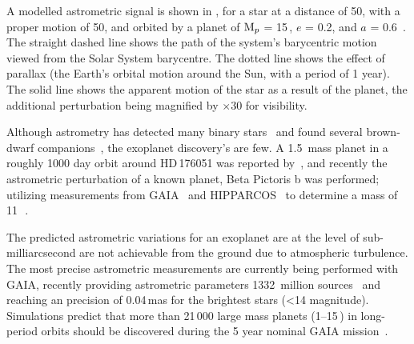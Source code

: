 A modelled astrometric signal is shown in , for a star at a distance of 50\pc, with a proper motion of 50\masperyr{}, and orbited by a planet of $\textrm{M}_{p}$ = 15\,\Mjup, $e$ = 0.2, and $a$ = 0.6\AU~\citep{perryman_extrasolar_2000}.
The straight dashed line shows the path of the system's barycentric motion viewed from the Solar System barycentre.
The dotted line shows the effect of parallax (the Earth's orbital motion around the Sun, with a period of 1 year).
The solid line shows the apparent motion of the star as a result of the planet, the additional perturbation being magnified by $\times 30$ for visibility.

Although astrometry has detected many binary stars~\citet[e.g.][]{gontcharov_new_2000} and found several brown-dwarf companions~\citep[e.g.][]{sahlmann_search_2011}, the exoplanet discovery's are few.
A 1.5\,\Mjup{} mass planet in a roughly 1000 day orbit around {HD\,176051} was reported by~\citet{muterspaugh_phases_2010}, and recently the astrometric perturbation of a known planet, {Beta Pictoris b} was performed; utilizing measurements from {GAIA}~\citep{gaiacollaboration_gaia_2016} and {HIPPARCOS}~\citep{esa_hipparcos_1997} to determine a mass of 11\,\Mjup~\citep{snellen_mass_2018}.

The predicted astrometric variations for an exoplanet are at the level of sub-milliarcsecond are not achievable from the ground due to atmospheric turbulence.
The most precise astrometric measurements are currently being performed with GAIA, recently providing astrometric parameters 1332~million sources~\citep{collaboration_gaia_2018} and reaching an precision of 0.04\,mas for the brightest stars (<14 magnitude).
Simulations predict that more than 21\,000 large mass planets (1--15\,\Mjup) in long-period orbits should be discovered during the 5 year nominal GAIA mission~\citet{perryman_astrometric_2014}. 

